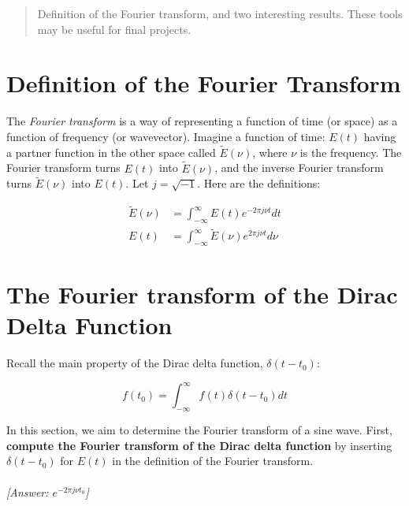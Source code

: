 \documentclass[10pt]{article}
\begin{document}
\maketitle

\begin{abstract}
Definition of the Fourier transform, and two interesting results.  These tools may be useful for final projects.
\end{abstract}
\noindent

\section{Definition of the Fourier Transform}

The \textit{Fourier transform} is a way of representing a function of time (or space) as a function of frequency (or wavevector).  Imagine a function of time: $E(t)$ having a partner function in the other space called $\widetilde{E}(\nu)$, where $\nu$ is the frequency.  The Fourier transform turns $E(t)$ into $\widetilde{E}(\nu)$, and the inverse Fourier transform turns $\widetilde{E}(\nu)$ into $E(t)$.  Let $j = \sqrt{-1}$.  Here are the definitions:

\begin{align}
\widetilde{E}(\nu) &= \int_{-\infty}^{\infty} E(t) e^{-2\pi j \nu t} dt \\
E(t) &= \int_{-\infty}^{\infty} \widetilde{E}(\nu) e^{2\pi j \nu t} d\nu
\end{align}

\section{The Fourier transform of the Dirac Delta Function}

Recall the main property of the Dirac delta function, $\delta(t-t_0)$:

\begin{equation}
f(t_0) = \int_{-\infty}^{\infty} f(t) \delta(t - t_0) dt
\end{equation}

In this section, we aim to determine the Fourier transform of a sine wave.  First, \textbf{compute the Fourier transform of the Dirac delta function} by inserting $\delta(t-t_0)$ for $E(t)$ in the definition of the Fourier transform. \\ \\ \textit{[Answer: $e^{-2\pi j \nu t_0}$]} \\ \vspace{1.5cm}
\end{document}
